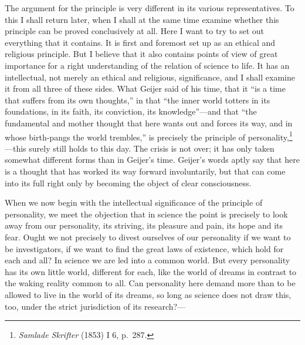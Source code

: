 \documentclass[12pt]{article}
\newcommand{\opage}[1]{\marginnote{\footnotesize\textit{[#1]}}}
\begin{document}
The argument for the principle is very different in its various
representatives. To this I shall return later, when I shall at the same time
examine whether this principle can be proved conclusively at all. Here I want
to try to set out everything that it contains. It is first and foremost set up
as an ethical and religious principle. But I believe that it also contains
points of view of great importance
\opage{7}%
for a right understanding of the relation of science to life. It has an
intellectual, not merely an ethical and religious, significance, and I shall
examine it from all three of these sides. What Geijer said of his time, that it
``is a time that suffers from its own thoughts,'' in that ``the inner world
totters in its foundations, in its faith, its conviction, its knowledge''---and
that ``the fundamental and mother thought that here wants out and forces its
way, and in whose birth-pangs the world trembles,'' is precisely the principle
of personality,\footnote{\textit{Samlade Skrifter} (1853) I 6, p.~287.}---this
surely still holds to this day. The crisis is not over; it has only taken
somewhat different forms than in Geijer's time. Geijer's words aptly say that
here is a thought that has worked its way forward involuntarily, but that can
come into its full right only by becoming the object of clear consciousness.

When we now begin with the intellectual significance of the principle of
personality, we meet the objection that in science
\opage{8}%
the point is precisely to look away from our personality, its striving, its
pleasure and pain, its hope and its fear. Ought we not precisely to divest
ourselves of our personality if we want to be investigators, if we want to find
the great laws of existence, which hold for each and all? In science we are
led into a common world. But every personality has its own little world,
different for each, like the world of dreams in contrast to the waking reality
common to all. Can personality here demand more than to be allowed to live in
the world of its dreams, so long as science does not draw this, too, under the
strict jurisdiction of its research?---
\end{document}
